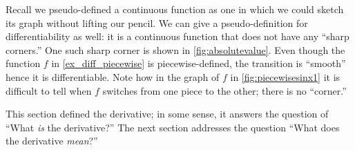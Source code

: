 Recall we pseudo-defined a continuous function as one in which we could sketch its graph without lifting our pencil. We can give a pseudo-definition for differentiability as well: it is a continuous function that does not have any ``sharp corners.'' One such sharp corner is shown in \autoref{fig:absolutevalue}. Even though the function $f$ in \autoref{ex_diff_piecewise} is piecewise-defined, the transition is ``smooth'' hence it is differentiable. Note how in the graph of $f$ in \autoref{fig:piecewisesinx1} it is difficult to tell when $f$ switches from one piece to the other; there is no ``corner.''


This section defined the derivative; in some sense, it answers the question of ``What \textit{is} the derivative?'' The next section addresses the question ``What does the derivative \textit{mean}?''



